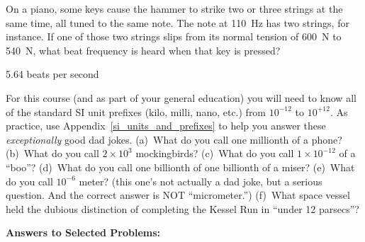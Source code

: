 \begin{Exercise}
On a piano, some keys cause the hammer to strike two or three strings at the same time, all tuned to the same note.  The note at 110~Hz has two strings, for instance.  If one of those two strings slips from its normal tension of 600~N to 540~N, what beat frequency is heard when that key is pressed? 
\end{Exercise}
\begin{Answer}
5.64 beats per second
\end{Answer}

\begin{Exercise}
For this course (and as part of your general education) you will need to know all of the standard SI unit prefixes (kilo, milli, nano, etc.) from $10^{-12}$ to $10^{+12}$. As practice, use Appendix~\ref{si_units_and_prefixes} to help you answer these \textit{exceptionally} good dad jokes.  (a)~What do you call one millionth of a phone?  (b)~What do you call $2 \times 10^3$ mockingbirds? (c)~What do you call $1 \times 10^{-12}$ of a ``boo''?  (d)~What do you call one billionth of one billionth of a miser?  (e)~What do you call $10^{-6}$ meter? (this one's not actually a dad joke, but a serious question. And the correct answer is NOT ``micrometer.'') (f)~What space vessel held the dubious distinction of completing the Kessel Run in ``under 12 parsecs''?
\end{Exercise}


\vspace{0.7in}

\textbf{Answers to Selected {\thesubsection} Problems:}
\label{waves_prob_answers}
\shipoutAnswer

\cleardoublepage
